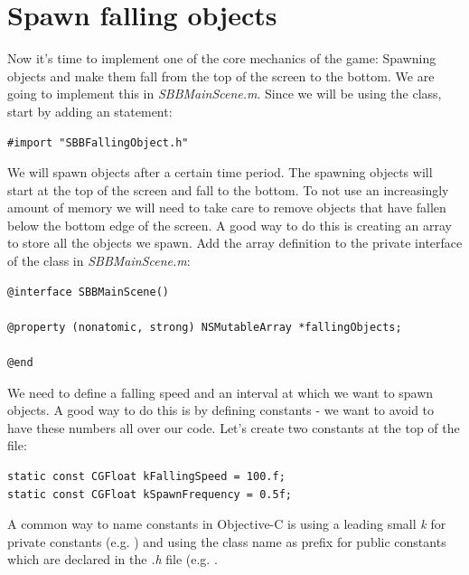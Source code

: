 \section{Spawn falling objects}
Now it's time to implement one of the core mechanics of the game: Spawning
objects and make them fall from the top of the screen to the bottom. We are
going to implement this in \textit{SBBMainScene.m}. Since we will be using the
 class, start by adding an 
statement:

\begin{lstlisting}
#import "SBBFallingObject.h"
\end{lstlisting}

We will spawn objects after a certain time period. The spawning objects will
start at the top of the screen and fall to the bottom. To not use an
increasingly amount of memory we will need to take care to remove objects that
have fallen below the bottom edge of the screen. A good way to do this is
creating an array to store all the objects we spawn. Add the array definition to
the private interface of the class in \textit{SBBMainScene.m}:

\begin{lstlisting}
@interface SBBMainScene()

@property (nonatomic, strong) NSMutableArray *fallingObjects;

@end
\end{lstlisting}

We need to define a falling speed and an interval at which we want to spawn
objects. A good way to do this is by defining constants - we want to avoid to
have these numbers all over our code. Let's create two constants at the top of
the file:

\begin{lstlisting}
static const CGFloat kFallingSpeed = 100.f;
static const CGFloat kSpawnFrequency = 0.5f;
\end{lstlisting}

\begin{details}[frametitle={Naming constants in Objective-C}] A common way to
name constants in Objective-C is using a leading small \textit{k}
for private constants (e.g. ) and using the class name
as prefix for public constants which are declared in the \textit{.h} file (e.g.
.
\end{details}


